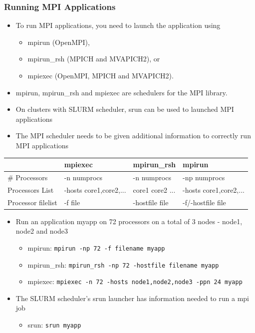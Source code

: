 \documentclass[10pt,t]{beamer}
\begin{document}
\begin{frame}
  \frametitle{Running MPI Applications}
  \begin{itemize}
  \item To run MPI applications, you need to launch the application using 
    \begin{itemize}
       \item mpirun (OpenMPI), 
       \item mpirun\_rsh (MPICH and MVAPICH2), or 
       \item mpiexec (OpenMPI, MPICH and MVAPICH2).
    \end{itemize}
  \item mpirun, mpirun\_rsh and mpiexec are schedulers for the MPI library.
  \item On clusters with SLURM scheduler, srun can be used to launched MPI applications
  \item The MPI scheduler needs to be given additional information to correctly run MPI applications
  \end{itemize}
  \begin{center}
   \small{
    \begin{tabular}{|faaa|}
      \hline
      & mpiexec & mpirun\_rsh & mpirun \\
      \hline
      \# Processors & -n numprocs & -n numprocs & -np numprocs \\
      Processors List & -hosts core1,core2,... & core1 core2 ... & -hosts core1,core2,... \\
      Processor filelist & -f file & -hostfile file & -f/-hostfile file \\
      \hline
    \end{tabular}
  }
  \end{center}
  \begin{itemize}
    \item Run an application myapp on 72 processors on a total of 3 nodes - node1, node2 and node3 
      \begin{itemize}
        \item mpirun: \lstinline[basicstyle=\small\ttfamily]|mpirun -np 72 -f filename myapp|
        \item mpirun\_rsh: \lstinline[basicstyle=\small\ttfamily]|mpirun_rsh -np 72 -hostfile filename myapp|
        \item mpiexec: \lstinline[basicstyle=\small\ttfamily]|mpiexec -n 72 -hosts node1,node2,node3 -ppn 24 myapp|
      \end{itemize}
    \item The SLURM scheduler's srun launcher has information needed to run a mpi job
      \begin{itemize}
        \item srun: \lstinline[basicstyle=\small\ttfamily]|srun myapp|
      \end{itemize}
  \end{itemize}
\end{frame}
\end{document}
